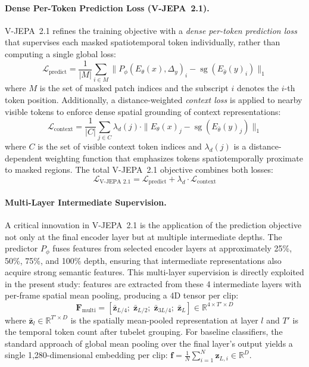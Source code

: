 \paragraph{Dense Per-Token Prediction Loss (V-JEPA~2.1).}
V-JEPA~2.1 \citep{murlabadia2026vjepa21} refines the training objective with a \emph{dense per-token prediction loss} that supervises each masked spatiotemporal token individually, rather than computing a single global loss:
\begin{equation}
    \mathcal{L}_{\text{predict}} = \frac{1}{|M|} \sum_{i \in M} \|P_\phi(E_\theta(x), \Delta_y)_i - \operatorname{sg}(E_{\bar{\theta}}(y)_i)\|_1
    \label{eq:vjepa21_obj}
\end{equation}
where $M$ is the set of masked patch indices and the subscript $i$ denotes the $i$-th token position. Additionally, a distance-weighted \emph{context loss} is applied to nearby visible tokens to enforce dense spatial grounding of context representations:
\begin{equation}
    \mathcal{L}_{\text{context}} = \frac{1}{|C|} \sum_{j \in C} \lambda_d(j) \cdot \|E_\theta(x)_j - \operatorname{sg}(E_{\bar{\theta}}(y)_j)\|_1
    \label{eq:vjepa21_context}
\end{equation}
where $C$ is the set of visible context token indices and $\lambda_d(j)$ is a distance-dependent weighting function that emphasizes tokens spatiotemporally proximate to masked regions. The total V-JEPA~2.1 objective combines both losses:
\begin{equation}
    \mathcal{L}_{\text{V-JEPA~2.1}} = \mathcal{L}_{\text{predict}} + \lambda_d \cdot \mathcal{L}_{\text{context}}
    \label{eq:vjepa21_total}
\end{equation}

\paragraph{Multi-Layer Intermediate Supervision.}
A critical innovation in V-JEPA~2.1 is the application of the prediction objective not only at the final encoder layer but at multiple intermediate depths. The predictor $P_\phi$ fuses features from selected encoder layers at approximately 25\%, 50\%, 75\%, and 100\% depth, ensuring that intermediate representations also acquire strong semantic features. This multi-layer supervision is directly exploited in the present study: features are extracted from these 4 intermediate layers with per-frame spatial mean pooling, producing a 4D tensor per clip:
\begin{equation}
    \mathbf{F}_{\text{multi}} = [\bar{\mathbf{z}}_{L/4};\; \bar{\mathbf{z}}_{L/2};\; \bar{\mathbf{z}}_{3L/4};\; \bar{\mathbf{z}}_{L}] \in \mathbb{R}^{4 \times T' \times D}
    \label{eq:vjepa_multilayer}
\end{equation}
where $\bar{\mathbf{z}}_l \in \mathbb{R}^{T' \times D}$ is the spatially mean-pooled representation at layer $l$ and $T'$ is the temporal token count after tubelet grouping. For baseline classifiers, the standard approach of global mean pooling over the final layer's output yields a single 1,280-dimensional embedding per clip: $\mathbf{f} = \frac{1}{N} \sum_{i=1}^{N} \mathbf{z}_{L,i} \in \mathbb{R}^{D}$.

